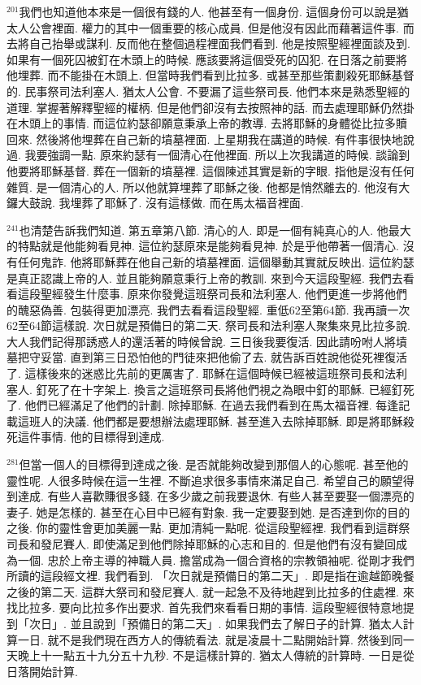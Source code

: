 \documentclass{book}
\begin{document}
$^{201}$我們也知道他本來是一個很有錢的人.
他甚至有一個身份.
這個身份可以說是猶太人公會裡面.
權力的其中一個重要的核心成員.
但是他沒有因此而藉著這件事.
而去將自己抬舉或謀利.
反而他在整個過程裡面我們看到.
他是按照聖經裡面談及到.
如果有一個死囚被釘在木頭上的時候.
應該要將這個受死的囚犯.
在日落之前要將他埋葬.
而不能掛在木頭上.
但當時我們看到比拉多.
或甚至那些策劃殺死耶穌基督的.
民事祭司法利塞人.
猶太人公會.
不要漏了這些祭司長.
他們本來是熟悉聖經的道理.
掌握著解釋聖經的權柄.
但是他們卻沒有去按照神的話.
而去處理耶穌仍然掛在木頭上的事情.
而這位約瑟卻願意秉承上帝的教導.
去將耶穌的身體從比拉多贖回來.
然後將他埋葬在自己新的墳墓裡面.
上星期我在講道的時候.
有件事很快地說過.
我要強調一點.
原來約瑟有一個清心在他裡面.
所以上次我講道的時候.
談論到他要將耶穌基督.
葬在一個新的墳墓裡.
這個陳述其實是新的字眼.
指他是沒有任何雜質.
是一個清心的人.
所以他就算埋葬了耶穌之後.
他都是悄然離去的.
他沒有大鑼大鼓說.
我埋葬了耶穌了.
沒有這樣做.
而在馬太福音裡面.

$^{241}$也清楚告訴我們知道.
第五章第八節.
清心的人.
即是一個有純真心的人.
他最大的特點就是他能夠看見神.
這位約瑟原來是能夠看見神.
於是乎他帶著一個清心.
沒有任何鬼詐.
他將耶穌葬在他自己新的墳墓裡面.
這個舉動其實就反映出.
這位約瑟是真正認識上帝的人.
並且能夠願意秉行上帝的教訓.
來到今天這段聖經.
我們去看看這段聖經發生什麼事.
原來你發覺這班祭司長和法利塞人.
他們更進一步將他們的醜惡偽善.
包裝得更加漂亮.
我們去看看這段聖經.
重低62至第64節.
我再讀一次62至64節這樣說.
次日就是預備日的第二天.
祭司長和法利塞人聚集來見比拉多說.
大人我們記得那誘惑人的還活著的時候曾說.
三日後我要復活.
因此請吩咐人將墳墓把守妥當.
直到第三日恐怕他的門徒來把他偷了去.
就告訴百姓說他從死裡復活了.
這樣後來的迷惑比先前的更厲害了.
耶穌在這個時候已經被這班祭司長和法利塞人.
釘死了在十字架上.
換言之這班祭司長將他們視之為眼中釘的耶穌.
已經釘死了.
他們已經滿足了他們的計劃.
除掉耶穌.
在過去我們看到在馬太福音裡.
每逢記載這班人的決議.
他們都是要想辦法處理耶穌.
甚至進入去除掉耶穌.
即是將耶穌殺死這件事情.
他的目標得到達成.

$^{281}$但當一個人的目標得到達成之後.
是否就能夠改變到那個人的心態呢.
甚至他的靈性呢.
人很多時候在這一生裡.
不斷追求很多事情來滿足自己.
希望自己的願望得到達成.
有些人喜歡賺很多錢.
在多少歲之前我要退休.
有些人甚至要娶一個漂亮的妻子.
她是怎樣的.
甚至在心目中已經有對象.
我一定要娶到她.
是否達到你的目的之後.
你的靈性會更加美麗一點.
更加清純一點呢.
從這段聖經裡.
我們看到這群祭司長和發尼賽人.
即使滿足到他們除掉耶穌的心志和目的.
但是他們有沒有變回成為一個.
忠於上帝主導的神職人員.
擔當成為一個合資格的宗教領袖呢.
從剛才我們所讀的這段經文裡.
我們看到.
「次日就是預備日的第二天」.
即是指在逾越節晚餐之後的第二天.
這群大祭司和發尼賽人.
就一起急不及待地趕到比拉多的住處裡.
來找比拉多.
要向比拉多作出要求.
首先我們來看看日期的事情.
這段聖經很特意地提到「次日」.
並且說到「預備日的第二天」.
如果我們去了解日子的計算.
猶太人計算一日.
就不是我們現在西方人的傳統看法.
就是凌晨十二點開始計算.
然後到同一天晚上十一點五十九分五十九秒.
不是這樣計算的.
猶太人傳統的計算時.
一日是從日落開始計算.
\end{document}
